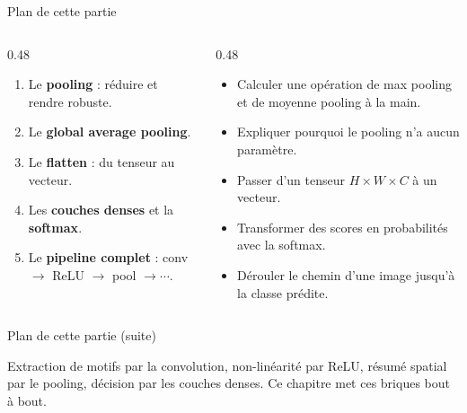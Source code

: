 
\begin{frame}{Plan de cette partie}
\begin{columns}[t]
\begin{column}{0.48\textwidth}
\begin{kbox}
\begin{enumerate}
  \item Le \textbf{pooling} : réduire et rendre robuste.
  \item Le \textbf{global average pooling}.
  \item Le \textbf{flatten} : du tenseur au vecteur.
  \item Les \textbf{couches denses} et la \textbf{softmax}.
  \item Le \textbf{pipeline complet} : conv $\to$ ReLU $\to$ pool $\to \cdots$.
\end{enumerate}
\end{kbox}
\end{column}
\begin{column}{0.48\textwidth}
\begin{ebox}
\begin{itemize}
  \item Calculer une opération de max pooling et de moyenne pooling à la main.
  \item Expliquer pourquoi le pooling n'a aucun paramètre.
  \item Passer d'un tenseur $H\times W\times C$ à un vecteur.
  \item Transformer des scores en probabilités avec la softmax.
  \item Dérouler le chemin d'une image jusqu'à la classe prédite.
\end{itemize}
\end{ebox}
\end{column}
\end{columns}
\vspace{1mm}

\end{frame}
\begin{frame}{Plan de cette partie (suite)}
\begin{wbox}
Extraction de motifs par la convolution, non-linéarité par ReLU, résumé spatial
par le pooling, décision par les couches denses. Ce chapitre met ces briques bout à bout.
\end{wbox}
\end{frame}

